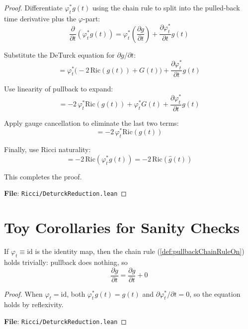 \begin{proof}
\leanok
{}
Differentiate $\varphi_t^* g(t)$ using the chain rule to split into the pulled-back time derivative plus the $\varphi$-part:
\[ \frac{\partial}{\partial t}(\varphi_t^* g(t)) = \varphi_t^*\left(\frac{\partial g}{\partial t}\right) + \frac{\partial \varphi_t^*}{\partial t}g(t) \]

Substitute the DeTurck equation for $\partial g/\partial t$:
\[ = \varphi_t^*\big(-2\,\mathrm{Ric}(g(t)) + G(t)\big) + \frac{\partial \varphi_t^*}{\partial t}g(t) \]

Use linearity of pullback to expand:
\[ = -2\,\varphi_t^*\mathrm{Ric}(g(t)) + \varphi_t^* G(t) + \frac{\partial \varphi_t^*}{\partial t}g(t) \]

Apply gauge cancellation to eliminate the last two terms:
\[ = -2\,\varphi_t^*\mathrm{Ric}(g(t)) \]

Finally, use Ricci naturality:
\[ = -2\,\mathrm{Ric}(\varphi_t^* g(t)) = -2\,\mathrm{Ric}(\hat{g}(t)) \]

This completes the proof.

\textbf{File}: \texttt{Ricci/DeturckReduction.lean}
\end{proof}

\section{Toy Corollaries for Sanity Checks}

\begin{lemma}
\label{lem:pullbackChainRuleOn_id}
\leanok
{}
If $\varphi_t \equiv \mathrm{id}$ is the identity map, then the chain rule (\ref{def:pullbackChainRuleOn}) holds trivially: pullback does nothing, so
\[ \frac{\partial g}{\partial t} = \frac{\partial g}{\partial t} + 0 \]
\end{lemma}

\begin{proof}
\leanok
{}
When $\varphi_t = \mathrm{id}$, both $\varphi_t^* g(t) = g(t)$ and $\partial \varphi_t^*/\partial t = 0$, so the equation holds by reflexivity.

\textbf{File}: \texttt{Ricci/DeturckReduction.lean}
\end{proof}


